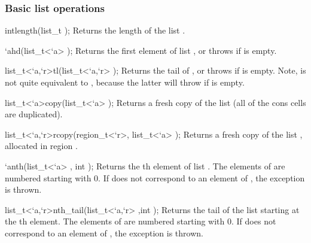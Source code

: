 \subsubsection*{Basic list operations}

\begin{defun2}{int}{length}{(list_t );}
  Returns the length of the list .
\end{defun2}

\begin{defun2}{`a}{hd}{(list_t<`a> );}
  Returns the first element of list , or throws
   if  is empty.
\end{defun2}

\begin{defun2}{list_t<`a,`r>}{tl}{(list_t<`a,`r> );}
  Returns the tail of , or throws  if
   is empty.  Note,  is not quite
  equivalent to , because the latter will throw
   if  is empty.
\end{defun2}

\begin{defun2}{list_t<`a>}{copy}{(list_t<`a> );}
  Returns a fresh copy of the list  (all of the cons cells
  are duplicated).
\end{defun2}

\begin{defun2}{list_t<`a,`r>}{rcopy}{(region_t<`r>, list_t<`a> );}
  Returns a fresh copy of the list , allocated in region
  .
\end{defun2}

\begin{defun2}{`a}{nth}{(list_t<`a> , int );}
  Returns the th element of list .  The elements of
   are numbered starting with 0.  If  does not
  correspond to an element of , the exception  is
  thrown.
\end{defun2}

\begin{defun2}{list_t<`a,`r>}{nth_tail}{(list_t<`a,`r> ,int );}
  Returns the tail of the list  starting at the th
  element.  The elements of  are numbered starting with 0.  If
   does not correspond to an element of , the
  exception  is thrown.
\end{defun2}

